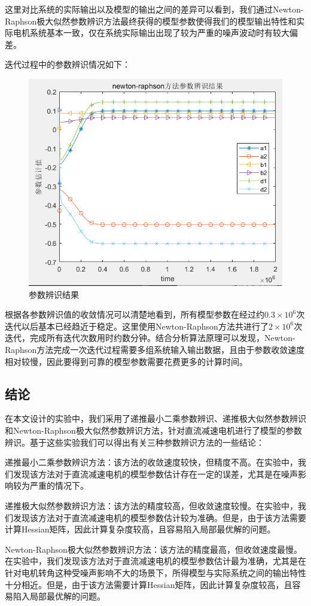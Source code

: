 \documentclass[UTF8, twocolumn]{article}
\begin{document}
这里对比系统的实际输出以及模型的输出之间的差异可以看到，我们通过Newton-Raphson极大似然参数辨识方法最终获得的模型参数使得我们的模型输出特性和实际电机系统基本一致，仅在系统实际输出出现了较为严重的噪声波动时有较大偏差。

迭代过程中的参数辨识情况如下：
\begin{figure}[H]
    \centering %
    \includegraphics[width=.4\textwidth]{figure/newton-转速-辨识结果.png} 
    \caption{参数辨识结果} %
\end{figure}
根据各参数辨识值的收敛情况可以清楚地看到，所有模型参数在经过约$0.3 \times 10^6$次迭代以后基本已经趋近于稳定。这里使用Newton-Raphson方法共进行了$2 \times 10^6$次迭代，完成所有迭代次数用时约数分钟。结合分析算法原理可以发现，Newton-Raphson方法完成一次迭代过程需要多组系统输入输出数据，且由于参数收敛速度相对较慢，因此要得到可靠的模型参数需要花费更多的计算时间。

\subsection{结论}
在本文设计的实验中，我们采用了递推最小二乘参数辨识、递推极大似然参数辨识和Newton-Raphson极大似然参数辨识方法，针对直流减速电机进行了模型的参数辨识。基于这些实验我们可以得出有关三种参数辨识方法的一些结论：

递推最小二乘参数辨识方法：该方法的收敛速度较快，但精度不高。在实验中，我们发现该方法对于直流减速电机的模型参数估计存在一定的误差，尤其是在噪声影响较为严重的情况下。

递推极大似然参数辨识方法：该方法的精度较高，但收敛速度较慢。在实验中，我们发现该方法对于直流减速电机的模型参数估计较为准确。但是，由于该方法需要计算Hessian矩阵，因此计算复杂度较高，且容易陷入局部最优解的问题。

Newton-Raphson极大似然参数辨识方法：该方法的精度最高，但收敛速度最慢。在实验中，我们发现该方法对于直流减速电机的模型参数估计最为准确，尤其是在针对电机转角这种受噪声影响不大的场景下，所得模型与实际系统之间的输出特性十分相近。但是，由于该方法需要计算Hessian矩阵，因此计算复杂度较高，且容易陷入局部最优解的问题。
\end{document}
